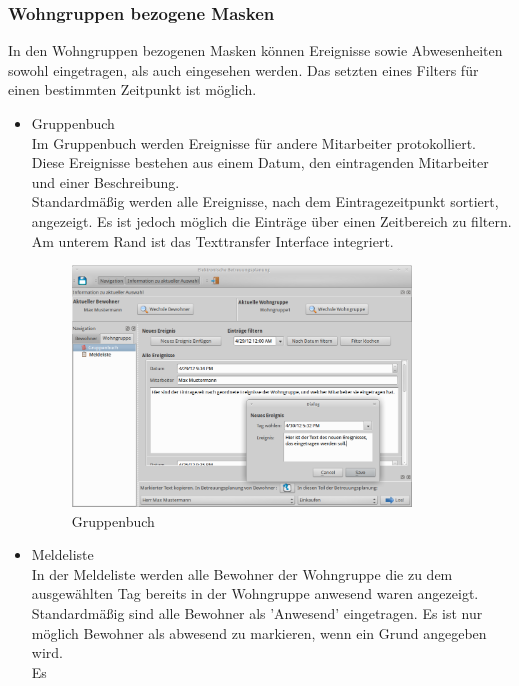 \subsubsection{Wohngruppen bezogene Masken}
In den Wohngruppen bezogenen Masken können Ereignisse sowie Abwesenheiten sowohl eingetragen, als auch eingesehen werden. Das setzten eines Filters
für einen bestimmten Zeitpunkt ist möglich.
\begin{itemize}
	\item Gruppenbuch\mbox{}\\
	\noindent
	Im Gruppenbuch werden Ereignisse für andere Mitarbeiter protokolliert. Diese Ereignisse bestehen aus einem Datum, den eintragenden Mitarbeiter und einer Beschreibung.\\Standardmäßig werden alle Ereignisse, nach dem Eintragezeitpunkt sortiert, angezeigt. Es ist jedoch möglich die Einträge über einen Zeitbereich zu filtern.\\Am unterem Rand ist das Texttransfer Interface integriert.
	\begin{figure}[h]
		\begin{center}
			\includegraphics[keepaspectratio=true, width=0.85\textwidth]{pics/client_ereignis.png}
			\caption{Gruppenbuch}
		\end{center}
	\end{figure}
	\FloatBarrier
	\newpage
	\item Meldeliste\mbox{}\\
	\noindent
	In der Meldeliste werden alle Bewohner der Wohngruppe die zu dem ausgewählten Tag bereits in der Wohngruppe anwesend waren angezeigt.
Standardmäßig sind alle Bewohner als 'Anwesend' eingetragen. Es ist nur möglich Bewohner als abwesend zu markieren, wenn ein Grund angegeben wird.\\Es

\end{itemize}

